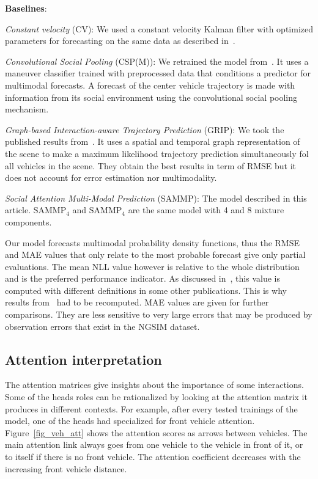 \documentclass[a4paper, 10pt, conference]{ieeeconf}      %
\begin{document}
\textbf{Baselines}:

\emph{Constant velocity} (CV): We used a constant velocity Kalman filter with optimized parameters for forecasting
on the same data as described in~\cite{Mercat2019}.

\emph{Convolutional Social Pooling} (CSP(M)): We retrained the model from~\cite{Deo2018}.
It uses a maneuver classifier trained with preprocessed data that conditions a predictor for multimodal forecasts.
A forecast of the center vehicle trajectory is made with information from its social environment using the convolutional social
pooling mechanism.

\emph{Graph-based Interaction-aware Trajectory Prediction} (GRIP): We took the published results from~\cite{Li2019}.
It uses a spatial and temporal graph representation of the scene to make a maximum likelihood trajectory
prediction simultaneously fol all vehicles in the scene.
They obtain the best results in term of RMSE but it does not account for error estimation nor multimodality.

\emph{Social Attention Multi-Modal Prediction} (SAMMP): The model described in this article. SAMMP$_4$ and SAMMP$_4$
are the same model with 4 and 8 mixture components.


Our model forecasts multimodal probability density functions, thus the RMSE and MAE values that only relate to the most
probable forecast give only partial evaluations.
The mean NLL value however is relative to the whole distribution and is the preferred performance indicator.
As discussed in~\cite{Mercat2019}, this value is computed with different definitions in some other publications.
This is why results from~\cite{Deo2018} had to be recomputed.
MAE values are given for further comparisons.
They are less sensitive to very large errors that may be produced by observation errors that exist in the NGSIM dataset.

\subsection{Attention interpretation}
\label{sec_application_attention}

The attention matrices give insights about the importance of some interactions.
Some of the heads roles can be rationalized by looking at the attention matrix it produces in different contexts.
For example, after every tested trainings of the model, one of the heads had specialized for front vehicle attention.
Figure~\ref{fig_veh_att} shows the attention scores as arrows between vehicles.
The main attention link always goes from one vehicle to the vehicle in front of it, or to itself if there is no
front vehicle.
The attention coefficient decreases with the increasing front vehicle distance.
\end{document}
